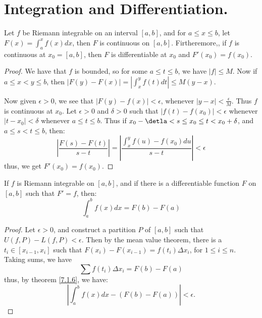 
\section{Integration and Differentiation.}

\begin{theorem}\label{7.3.1}
    Let $f$ be Riemann integrable on an interval  $[a,b]$, and for  $a \leq x
    \leq b$, let  $F(x)=\int_{a}^{x}{f(x)}dx$, then  $F$ is continuous on
    $[a,b]$. Firtheremore,, if  $f$ is continuous at $x_0=[a,b]$, then $F$ is
    differentiable at  $ x_0$ and $F'(x_0)=f(x_0)$.
\end{theorem}
\begin{proof}
    We have that $f$ is bounded, so for some  $a \leq t \leq b$, we have  $|f|
    \leq M$. Now if  $a \leq x<y \leq b$, then  $|F(y)-F(x)|=|\int_{x}^{y}{f(t)}
    dt| \leq M(y-x)$.

    Now given $\epsilon>0$, we see that  $|F(y)-f(x)|<\epsilon$, whenever
    $|y-x|< \frac{\epsilon}{M}$. Thus $f$ is continuous at  $ x_0$. Let
    $\epsilon>0$ and  $\delta>0$ such that  $|f(t)-f(x_0)|<\epsilon$ whenever
    $|t-x_0|<\delta$ whenever $a \leq t \leq b$. Thus if  $ x_0-\detla<s \leq
    x_0 \leq t<x_0+\delta$, and $a \leq s<t \leq b$, then:
        \begin{equation*}
            |\frac{F(s)-F(t)}{s-t}|=|\frac{\int_{x}^{y}{f(u)-f(x_0)} du}{s-t}|<\epsilon
        \end{equation*}
        thus, we get $F'(x_0)=f(x_0)$.
\end{proof}

\begin{theorem}\label{7.3.2}
    If $f$ is Riemann integrable on  $[a,b]$, and if there is a differentiable
    function  $F$ on  $[a,b]$ such that  $F'=f$, then:
        \begin{equation}
            \int_{a}^{b}{f(x)} dx=F(b)-F(a)
        \end{equation}
\end{theorem}
\begin{proof}
    Let $\epsilon>0$, and construct a partition  $P$ of  $[a,b]$ such that
    $U(f,P)-L(f,P)<\epsilon$. Then by the mean value theorem, there is a  $t_i
    \in [x_{i-1},x_i]$ such that $F(x_i)-F(x_{i-1})=f(t_i) \Delta{x_i}$, for  $1
    \leq i \leq n$. Taking sums, we have
        \begin{equation}
            \sum{f(t_i) \Delta{x_i}}=F(b)-F(a)
        \end{equation}
    thus, by theorem \ref{7.1.6}, we have:
        \begin{equation*}
            |\int_{a}^{b}{f(x) dx}-(F(b)-F(a))|<\epsilon.
        \end{equation*}
\end{proof}


